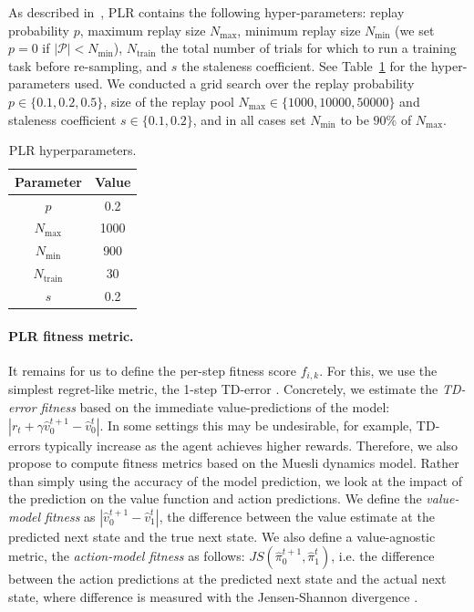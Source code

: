 As described in~\citet{jiang2021robustplr, jiang2020prioritized}, PLR contains the following hyper-parameters: replay probability $p$, maximum replay size $N_{\textrm{max}}$, minimum replay size $N_{\textrm{min}}$ (we set $p = 0$ if $|\mathcal{P}| < N_{\textrm{min}}$), $N_{\textrm{train}}$ the total number of trials for which to run a training task before re-sampling, and $s$ the staleness coefficient. See Table~\ref{tab:plr_hyperparameters} for the hyper-parameters used. We conducted a grid search over the replay probability $p\in\{0.1,0.2,0.5\}$, size of the replay pool $N_{\textrm{max}} \in \{1000, 10000, 50000\}$ and staleness coefficient $s\in\{0.1,0.2\}$, and in all cases set $N_{\textrm{min}}$ to be $90\%$ of $N_{\textrm{max}}$. 

\begin{table}[h!]
    \centering
    \caption{PLR hyperparameters.}
    \begin{tabular}{c|c}
         Parameter & Value \\ \hline
         $p$ & 0.2 \\
         $N_{\textrm{max}}$ & 1000 \\
         $N_{\textrm{min}}$ & 900 \\
         $N_{\textrm{train}}$ & 30 \\
         $s$ & 0.2
    \end{tabular}
    \label{tab:plr_hyperparameters}
\end{table}

\paragraph{PLR fitness metric.}
It remains for us to define the per-step fitness score $f_{i,k}$. For this, we use the simplest regret-like metric, the 1-step TD-error \citep{jiang2020prioritized, schaul2015prioritized}. Concretely, we estimate the \emph{TD-error fitness} based on the immediate value-predictions of the model: $|r_{t} + \gamma \hat{v}^{t+1}_0 - \hat{v}^t_0|$. In some settings this may be undesirable, for example, TD-errors typically increase as the agent achieves higher rewards. Therefore, we also propose to compute fitness metrics based on the Muesli dynamics model. Rather than simply using the accuracy of the model prediction, we look at the impact of the prediction on the value function and action predictions. We define the \emph{value-model fitness} as $|\hat{v}^{t+1}_0 - \hat{v}^t_1|$, the difference between the value estimate at the predicted next state and the true next state. We also define a value-agnostic metric, the \emph{action-model fitness} as follows: $JS(\hat{\pi}^{t+1}_0, \hat{\pi}^t_1)$, i.e. the difference between the action predictions at the predicted next state and the actual next state, where difference is measured with the Jensen-Shannon divergence \citep{NIPS2017_fb60d411, NEURIPS2021_08f0efeb, FilosVMFBFBS0O22, pislar2022when}.

